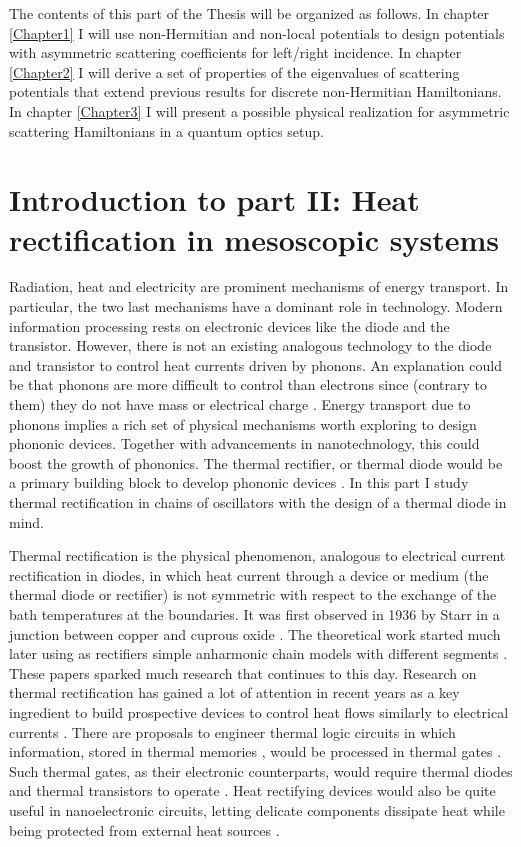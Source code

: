 The contents of this part of the Thesis will be organized as follows. In chapter \ref{Chapter1} I will use non-Hermitian and non-local potentials to design potentials with asymmetric scattering coefficients for left/right incidence. In chapter \ref{Chapter2} I will derive a set of properties of the eigenvalues of scattering potentials that extend previous results for discrete non-Hermitian Hamiltonians. In chapter \ref{Chapter3} I will present a possible physical realization for asymmetric scattering Hamiltonians in a quantum optics setup.


\section*{Introduction to part II: Heat rectification in mesoscopic systems}

Radiation, heat and electricity are prominent mechanisms of energy transport. In particular, the two last mechanisms have a dominant role in technology. Modern information processing rests on electronic devices like the diode and the transistor. However, there is not an existing analogous technology to the diode and transistor to control heat currents driven by phonons. An explanation could be that phonons are more difficult to control than electrons since (contrary to them) they do not have mass or electrical charge \cite{Li2012}. Energy transport due to phonons implies a rich set of physical mechanisms worth exploring to design phononic devices. Together with advancements in nanotechnology, this could boost the growth of phononics. The thermal rectifier, or thermal diode would be a primary building block to develop phononic devices \cite{Li2012}. In this part I study thermal rectification in chains of oscillators with the design of a thermal diode in mind.

Thermal rectification is the physical phenomenon, analogous to electrical current rectification in diodes, in which heat current through a device or medium (the thermal diode or rectifier) is not symmetric with respect to the exchange of the bath temperatures at the boundaries. It was  first observed in 1936 by Starr in a junction between copper and cuprous oxide \cite{Starr1936}. The theoretical work started much later using as rectifiers simple anharmonic chain models
with different segments \cite{Terraneo2002,Li2004}. These papers sparked much research that continues to this day. Research on thermal rectification has gained a lot of attention in recent years as a key ingredient to build prospective devices to control heat flows similarly to electrical currents \cite{Roberts2011,Li2012}. There are  proposals to engineer thermal logic circuits \cite{Ye2017} in which information, stored in thermal memories \cite{Wang2008}, would be processed in thermal gates \cite{Wang2007}. Such thermal gates, as their electronic counterparts,  would require thermal diodes and thermal transistors to operate \cite{Li2006,Joulain2016}.
Heat rectifying devices would also be quite useful in nanoelectronic circuits, letting delicate components dissipate heat while being protected from external heat sources \cite{Roberts2011}.


